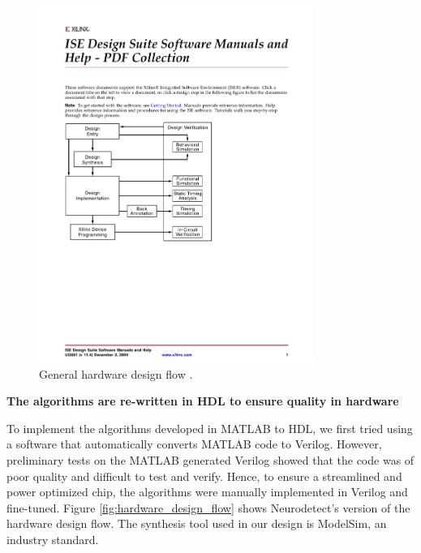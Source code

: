 \documentclass[usletter, 11pt]{extarticle}
\begin{document}
\begin{figure}[!h]
	\centering
	\includegraphics[width = 0.8\textwidth]{img/Round6_HardwareDiagram_overview}
	\caption{General hardware design flow \protect\cite{xilinx_manual}.}
	\label{fig:hardware_diagram}
\end{figure}

\vspace{11pt}
\textbf{The algorithms are re-written in HDL to ensure quality in hardware}

To implement the algorithms developed in MATLAB to HDL, we first tried using a software that automatically converts MATLAB code to Verilog. However, preliminary tests on the MATLAB generated Verilog showed that the code was of poor quality and difficult to  test and verify. Hence, to ensure a streamlined and power optimized chip, the algorithms were manually implemented in Verilog and fine-tuned. Figure \ref{fig:hardware_design_flow} shows Neurodetect’s version of the hardware design flow. The synthesis tool used in our design is ModelSim, an industry standard.
\end{document}
